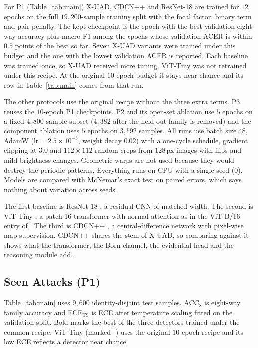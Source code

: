 \documentclass[conference]{IEEEtran}
\newcommand{\sub}[1]{\subsection{\texorpdfstring{\textbf{#1}}{#1}}}
\begin{document}
For P1 (Table~\ref{tab:main}) X-UAD, CDCN++ and ResNet-18 are trained for $12$ epochs
on the full $19{,}200$-sample training split with the focal factor, binary term and
pair penalty. The kept checkpoint is the epoch with the best validation eight-way
accuracy plus macro-F1 among the epochs whose validation ACER is within $0.5$ points
of the best so far. Seven X-UAD variants were trained under this budget and the one
with the lowest validation ACER is reported. Each baseline was trained once, so X-UAD
received more tuning. ViT-Tiny was not retrained under this recipe. At the original
$10$-epoch budget it stays near chance and its row in Table~\ref{tab:main} comes from
that run.

The other protocols use the original recipe without the three extra terms. P3 reuses
the $10$-epoch P1 checkpoints. P2 and its open-set ablation use $5$ epochs on a fixed
$4{,}800$-sample subset ($4{,}382$ after the held-out family is removed) and the
component ablation uses $5$ epochs on $3{,}592$ samples. All runs use batch size $48$,
AdamW ($\text{lr}=2.5\times10^{-3}$, weight decay $0.02$) with a one-cycle schedule,
gradient clipping at $3.0$ and $112\times112$ random crops from $128$\,px images with
flips and mild brightness changes. Geometric warps are not used because they would
destroy the periodic patterns. Everything runs on CPU with a single seed (0). Models
are compared with McNemar's exact test on paired errors, which says nothing about
variation across seeds.

The first baseline is ResNet-18 \cite{he2016resnet}, a residual CNN of matched
width. The second is ViT-Tiny \cite{dosovitskiy2021vit}, a patch-16 transformer with
normal attention as in the ViT-B/16 entry of \cite{yu2024unified}. The third is CDCN++
\cite{yu2020cdcn,yu2021revisiting}, a central-difference network with pixel-wise map
supervision. CDCN++ shares the stem of X-UAD, so comparing against it shows what the
transformer, the Born channel, the evidential head and the reasoning module add.

\sub{Seen Attacks (P1)}

\begin{table}
\centering
\caption{Results on P1}
\label{tab:main}
\scriptsize

\end{table}

Table~\ref{tab:main} uses $9{,}600$ identity-disjoint test samples. ACC$_8$ is
eight-way family accuracy and ECE$_{\text{TS}}$ is ECE after temperature scaling
fitted on the validation split. Bold marks the best of the three detectors trained
under the common recipe. ViT-Tiny (marked $^{\dagger}$) uses the original $10$-epoch
recipe and its low ECE reflects a detector near chance.
\end{document}
